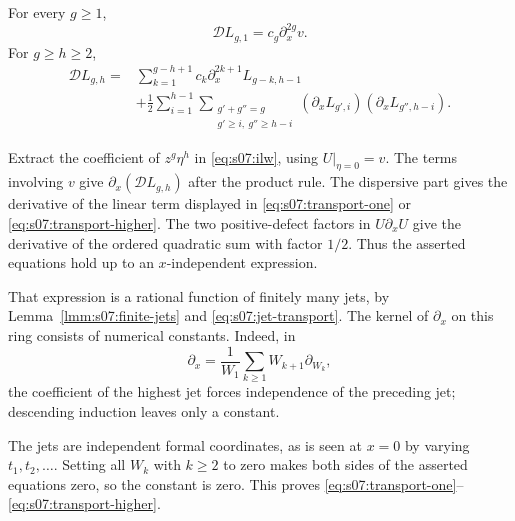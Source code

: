 \begin{prp}\label{prp:s07:transport}
For every $g\geq1$,
\begin{equation}\label{eq:s07:transport-one}
 \mathscr DL_{g,1}=c_g\partial_x^{2g}v.
\end{equation}
For $g\geq h\geq2$,
\begin{equation}\label{eq:s07:transport-higher}
 \begin{aligned}
 \mathscr DL_{g,h}
 ={}&\sum_{k=1}^{g-h+1}c_k\partial_x^{2k+1}L_{g-k,h-1}\\
 &+\frac12\sum_{i=1}^{h-1}
   \sum_{\substack{g'+g''=g\\g'\geq i,\ g''\geq h-i}}
       (\partial_xL_{g',i})(\partial_xL_{g'',h-i}).
 \end{aligned}
\end{equation}
\end{prp}
\begin{prf}
Extract the coefficient of $z^g\eta^h$ in
\eqref{eq:s07:ilw}, using $U|_{\eta=0}=v$. The terms involving
$v$ give $\partial_x(\mathscr DL_{g,h})$ after the product rule.
The dispersive part gives the derivative of the linear term displayed
in \eqref{eq:s07:transport-one} or
\eqref{eq:s07:transport-higher}. The two positive-defect factors
in $U\partial_xU$ give the derivative of the ordered quadratic sum
with factor $1/2$. Thus the asserted equations hold up to an
$x$-independent expression.

That expression is a rational function of finitely many jets, by
Lemma~\ref{lmm:s07:finite-jets} and
\eqref{eq:s07:jet-transport}. The kernel of $\partial_x$ on this
ring consists of numerical constants. Indeed, in
\[
 \partial_x=\frac1{W_1}\sum_{k\geq1}W_{k+1}\partial_{W_k},
\]
the coefficient of the highest jet forces independence of the
preceding jet; descending induction leaves only a constant.

The jets are independent formal coordinates, as is seen at $x=0$
by varying $t_1,t_2,\ldots$. Setting all $W_k$ with $k\geq2$ to
zero makes both sides of the asserted equations zero, so the
constant is zero. This proves
\eqref{eq:s07:transport-one}--\eqref{eq:s07:transport-higher}.
\end{prf}

